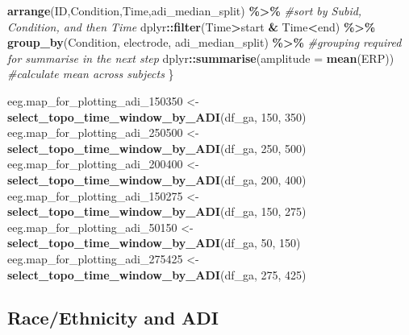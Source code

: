 \documentclass[
]{article}
\newenvironment{Shaded}{\begin{snugshade}}{\end{snugshade}}
\newcommand{\AttributeTok}[1]{\textcolor[rgb]{0.13,0.29,0.53}{#1}}
\newcommand{\CommentTok}[1]{\textcolor[rgb]{0.56,0.35,0.01}{\textit{#1}}}
\newcommand{\DecValTok}[1]{\textcolor[rgb]{0.00,0.00,0.81}{#1}}
\newcommand{\FunctionTok}[1]{\textcolor[rgb]{0.13,0.29,0.53}{\textbf{#1}}}
\newcommand{\NormalTok}[1]{#1}
\newcommand{\OtherTok}[1]{\textcolor[rgb]{0.56,0.35,0.01}{#1}}
\newcommand{\SpecialCharTok}[1]{\textcolor[rgb]{0.81,0.36,0.00}{\textbf{#1}}}
\begin{document}
\begin{Shaded}
\begin{Highlighting}[]
  \FunctionTok{arrange}\NormalTok{(ID,Condition,Time,adi\_median\_split) }\SpecialCharTok{\%\textgreater{}\%} \CommentTok{\#sort by Subid, Condition, and then Time}
\NormalTok{  dplyr}\SpecialCharTok{::}\FunctionTok{filter}\NormalTok{(Time}\SpecialCharTok{\textgreater{}}\NormalTok{start }\SpecialCharTok{\&}\NormalTok{ Time}\SpecialCharTok{\textless{}}\NormalTok{end) }\SpecialCharTok{\%\textgreater{}\%}
  \FunctionTok{group\_by}\NormalTok{(Condition, electrode, adi\_median\_split) }\SpecialCharTok{\%\textgreater{}\%} \CommentTok{\#grouping required for summarise in the next step}
\NormalTok{  dplyr}\SpecialCharTok{::}\FunctionTok{summarise}\NormalTok{(}\AttributeTok{amplitude =} \FunctionTok{mean}\NormalTok{(ERP)) }\CommentTok{\#calculate mean across subjects}
\NormalTok{\}}

\NormalTok{eeg.map\_for\_plotting\_adi\_150350 }\OtherTok{\textless{}{-}} \FunctionTok{select\_topo\_time\_window\_by\_ADI}\NormalTok{(df\_ga, }\DecValTok{150}\NormalTok{, }\DecValTok{350}\NormalTok{)}
\NormalTok{eeg.map\_for\_plotting\_adi\_250500 }\OtherTok{\textless{}{-}} \FunctionTok{select\_topo\_time\_window\_by\_ADI}\NormalTok{(df\_ga, }\DecValTok{250}\NormalTok{, }\DecValTok{500}\NormalTok{)}
\NormalTok{eeg.map\_for\_plotting\_adi\_200400 }\OtherTok{\textless{}{-}} \FunctionTok{select\_topo\_time\_window\_by\_ADI}\NormalTok{(df\_ga, }\DecValTok{200}\NormalTok{, }\DecValTok{400}\NormalTok{)}
\NormalTok{eeg.map\_for\_plotting\_adi\_150275 }\OtherTok{\textless{}{-}} \FunctionTok{select\_topo\_time\_window\_by\_ADI}\NormalTok{(df\_ga, }\DecValTok{150}\NormalTok{, }\DecValTok{275}\NormalTok{)}
\NormalTok{eeg.map\_for\_plotting\_adi\_50150 }\OtherTok{\textless{}{-}} \FunctionTok{select\_topo\_time\_window\_by\_ADI}\NormalTok{(df\_ga, }\DecValTok{50}\NormalTok{, }\DecValTok{150}\NormalTok{)}
\NormalTok{eeg.map\_for\_plotting\_adi\_275425 }\OtherTok{\textless{}{-}} \FunctionTok{select\_topo\_time\_window\_by\_ADI}\NormalTok{(df\_ga, }\DecValTok{275}\NormalTok{, }\DecValTok{425}\NormalTok{)}
\end{Highlighting}
\end{Shaded}

\hypertarget{raceethnicity-and-adi}{%
\subsection{Race/Ethnicity and ADI}\label{raceethnicity-and-adi}}
\end{document}

